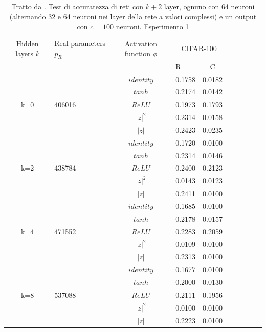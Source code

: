\documentclass[a4paper,12pt]{report}
\begin{document}
 
 \begin{table}
  \centering
  \begin{tabular}{cp{} cp{}   cp{} cp{} cp{}}
   \cline{1-5}
   Hidden layers $k$ & Real parameters $p_R$ & Activation function $\phi$ & \multicolumn{2}{c}{CIFAR-100}\\
   \cline{4-5}
   & & & R & C \\
   \cline{1-5}
   & & $identity$ & 0.1758 & 0.0182 \\
   \cline{3-5}
   & & $tanh$ & 0.2174 & 0.0142 \\
   \cline{3-5}
   k=0 & 406016 & $ReLU$ & 0.1973 & 0.1793 \\
   \cline{3-5}
   & & $|z|^2$ & 0.2314 & 0.0158 \\
   \cline{3-5}
   & & $|z|$ & 0.2423 & 0.0235 \\
   \cline{1-5}
  
   & & $identity$ & 0.1720 & 0.0100 \\
   \cline{3-5}
   & & $tanh$ & 0.2314 & 0.0146 \\
   \cline{3-5}
   k=2 & 438784 & $ReLU$ & 0.2400 & 0.2123 \\
   \cline{3-5}
   & & $|z|^2$ & 0.0143 & 0.0123 \\
   \cline{3-5}
   & & $|z|$ & 0.2411 & 0.0100 \\
   \cline{1-5}
  
   & & $identity$ & 0.1685 & 0.0100 \\
   \cline{3-5}
   & & $tanh$ & 0.2178 & 0.0157 \\
   \cline{3-5}
   k=4 & 471552 & $ReLU$ & 0.2283 & 0.2059 \\
   \cline{3-5}
   & & $|z|^2$ & 0.0109 & 0.0100 \\
   \cline{3-5}
   & & $|z|$ & 0.2313 & 0.0100 \\
   \cline{1-5}
   
   & & $identity$ & 0.1677 & 0.0100 \\
   \cline{3-5}
   & & $tanh$ & 0.2000 & 0.0130 \\
   \cline{3-5}
   k=8 & 537088 & $ReLU$ & 0.2111 & 0.1956 \\
   \cline{3-5}
   & & $|z|^2$ & 0.0100 & 0.0100 \\
   \cline{3-5}
   & & $|z|$ & 0.2223 & 0.0100 \\
   \cline{1-5}
  \end{tabular}
  \caption{Tratto da \cite{monning2018evaluation}. Test di accuratezza di reti con $k+2$ layer, ognuno con 64 neuroni (alternando 32 e 64 neuroni nei layer della rete a valori complessi) e un output con $c=100$ neuroni. Esperimento 1}
  \label{CIFAR-1001Tab}
 \end{table}
 
\end{document}
